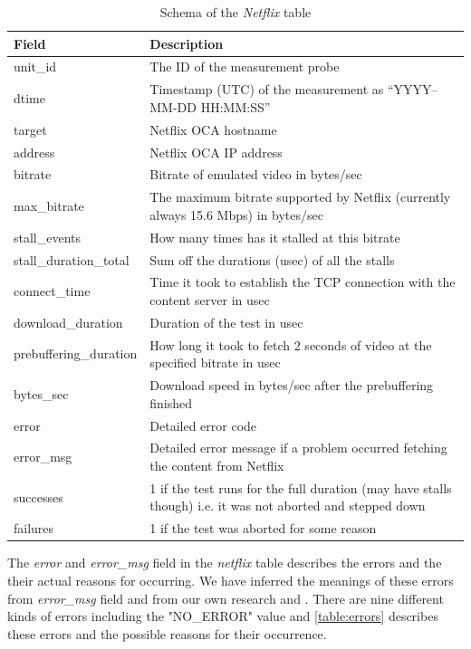 \begin{table}[!h]
	\centering
	\caption{Schema of the \textit{Netflix} table}
	\label{table:netflix}
	\begin{tabular}{lp{11cm}}
  		\toprule
  		\textbf{Field} & \textbf{Description} \\ 
  		\midrule
  		unit\_id & The ID of the measurement probe \\ 
  		dtime & Timestamp (UTC) of the measurement as “YYYY–MM-DD HH:MM:SS” \\ 
		target & Netflix OCA hostname \\ 
		address &  Netflix OCA IP address \\ 
		bitrate & Bitrate of emulated video in bytes/sec \\ 
		max\_bitrate & The maximum bitrate supported by Netflix (currently always 15.6 Mbps) in bytes/sec \\ 
		stall\_events & How many times has it stalled at this bitrate \\  
		stall\_duration\_total & Sum off the durations (usec) of all the stalls \\ 
		connect\_time & Time it took to establish the TCP connection with the content server in usec \\ 
		download\_duration & Duration of the test in usec \\ 
		prebuffering\_duration &  How long it took to fetch 2 seconds of video at the specified bitrate in usec \\ 
		bytes\_sec  & Download speed in bytes/sec after the prebuffering finished \\ 
		error & Detailed error code \\ 
		error\_msg  &  Detailed error message if a problem occurred fetching the content from Netflix \\ 
		successes  & 1 if the test runs for the full duration (may have stalls though)   i.e. it was not aborted and stepped down \\ 
		failures  & 1 if the test was aborted for some reason \\
  		\bottomrule
\end{tabular}
\end{table}

\FloatBarrier

The \textit{error} and \textit{error\_msg} field in the \textit{netflix} table describes the errors and the their actual reasons for occurring. We have inferred the meanings of these errors from \textit{error\_msg} field and from our own research \cite{rfc2616} and \cite{httperror}. There are nine different kinds of errors including the "NO\_ERROR" value and \cref{table:errors} describes these errors and the possible reasons for their occurrence.

